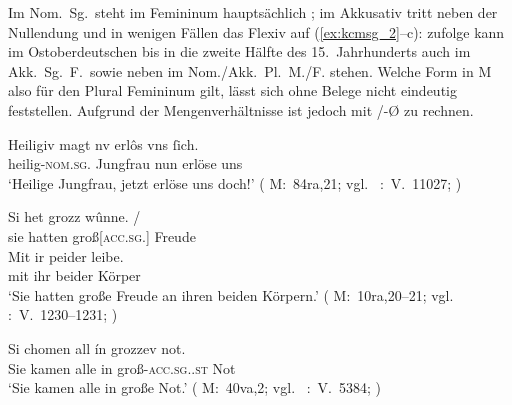 Im Nom.\ Sg.\ steht im Femininum hauptsächlich  ; im
Akkusativ tritt neben der Nullendung und  in wenigen Fällen das Flexiv
 auf (\ref{ex:kcmsg_2}--c): \citet[191--192]{reichmannwegera1993}
zufolge kann im Ostoberdeutschen bis in die zweite Hälfte des
15.~Jahrhunderts  auch im Akk.\ Sg.\ F.\ sowie  neben
 im Nom./Akk.\ Pl.\ M./F. stehen. Welche Form in M also für den Plural
Femininum gilt, lässt sich ohne Belege nicht eindeutig
feststellen. Aufgrund der Mengenverhältnisse ist jedoch mit /-Ø zu
rechnen.

\begin{exe}
\ex \label{ex:kcmsg}
	\begin{xlist}
	\ex \label{ex:kcmsg_1}
		\gll Heiligiv magt nv erlôs {vns ſich}. \\
			heilig-\textsc{nom.sg.\FemF} Jungfrau nun erlöse uns\footnotemark \\
		\trans `Heilige Jungfrau, jetzt erlöse uns doch!'
			(%
				M:~84ra,21; vgl.~%
				\KC:~V.~11027;
				\cite[283]{schroeder1895}%
			)

	\ex \label{ex:kcmsg_2}
		\gll Si het grozz wûnne. {/} \\
			sie hatten groß[\textsc{acc.sg.\FemI}] Freude \\
		\gll Mit ir peider leibe. \\
			mit ihr beider Körper \\
		\trans `Sie hatten große Freude an ihren beiden Körpern.'
			(%
				M:~10ra,20--21; vgl.~%
				\KC:~V.~1230--1231;
				\cite[104]{schroeder1895}%
			)

	\ex \label{ex:kcmsg_3}
		\gll Si chomen all ín grozzev not. \\
			Sie kamen alle in groß-\textsc{acc.sg.\FemI.st} Not \\
		\trans `Sie kamen alle in große Not.'
			(%
				M:~40va,2; vgl.~%
				\KC:~V.~5384;
				\cite[180]{schroeder1895}%
			)
	\end{xlist}
\end{exe}

